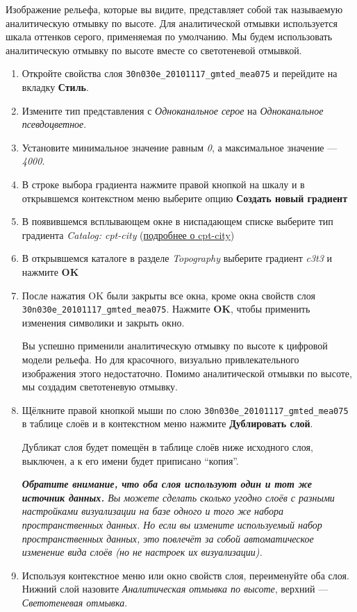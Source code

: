 \documentclass[
  12pt,
]{book}
\begin{document}
Изображение рельефа, которые вы видите, представляет собой так называемую аналитическую отмывку по высоте. Для аналитической отмывки используется шкала оттенков серого, применяемая по умолчанию. Мы будем использовать аналитическую отмывку по высоте вместе со светотеневой отмывкой.

\begin{enumerate}
\def\labelenumi{\arabic{enumi}.}
\item
  Откройте свойства слоя \texttt{30n030e\_20101117\_gmted\_mea075} и перейдите на вкладку \textbf{Стиль}.
\item
  Измените тип представления с \emph{Одноканальное серое} на \emph{Одноканальное псевдоцветное}.
\item
  Установите минимальное значение равным \emph{0}, а максимальное значение --- \emph{4000}.
\item
  В строке выбора градиента нажмите правой кнопкой на шкалу и в открывшемся контекстном меню выберите опцию \textbf{Создать новый градиент}
\item
  В появившемся всплывающем окне в ниспадающем списке выберите тип градиента \emph{Catalog: cpt-city} (\href{http://soliton.vm.bytemark.co.uk/pub/cpt-city/}{подробнее о cpt-city})
\item
  В открывшемся каталоге в разделе \emph{Topography} выберите градиент \emph{c3t3} и нажмите \textbf{OK}
\item
  После нажатия OK были закрыты все окна, кроме окна свойств слоя \texttt{30n030e\_20101117\_gmted\_mea075}. Нажмите \textbf{OK}, чтобы применить изменения символики и закрыть окно.

  Вы успешно применили аналитическую отмывку по высоте к цифровой модели рельефа. Но для красочного, визуально привлекательного изображения этого недостаточно. Помимо аналитической отмывки по высоте, мы создадим светотеневую отмывку.
\item
  Щёлкните правой кнопкой мыши по слою \texttt{30n030e\_20101117\_gmted\_mea075} в таблице слоёв и в контекстном меню нажмите \textbf{Дублировать слой}.

  Дубликат слоя будет помещён в таблице слоёв ниже исходного слоя, выключен, а к его имени будет приписано ``копия''.

  \emph{\textbf{Обратите внимание, что оба слоя используют один и тот же источник данных.} Вы можете сделать сколько угодно слоёв с разными настройками визуализации на базе одного и того же набора пространственных данных. Но если вы измените используемый набор пространственных данных, это повлечёт за собой автоматическое изменение вида слоёв (но не настроек их визуализации).}
\item
  Используя контекстное меню или окно свойств слоя, переименуйте оба слоя. Нижний слой назовите \emph{Аналитическая отмывка по высоте}, верхний --- \emph{Светотеневая отмывка}.


\end{enumerate}
\end{document}

